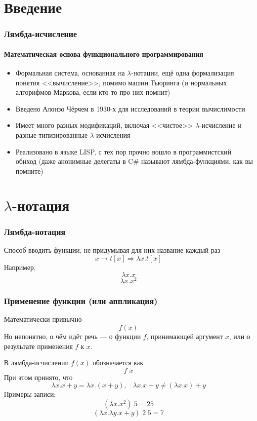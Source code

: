\documentclass{../../slides-style}
\begin{document}
    
    \begin{frame}[plain]
        \titlepage
    \end{frame}

    \section{Введение}
    
    \begin{frame}
        \frametitle{Лямбда-исчисление}
        \framesubtitle{Математическая основа функционального программирования}
        \begin{itemize}
            \item Формальная система, основанная на $\lambda$-нотации, ещё одна формализация
                    понятия <<вычисление>>, помимо машин Тьюринга (и нормальных алгорифмов
                    Маркова, если кто-то про них помнит)
            \item Введено Алонзо Чёрчем в 1930-х для исследований в теории вычислимости
            \item Имеет много разных модификаций, включая <<чистое>> $\lambda$-исчисление и
                    разные типизированные $\lambda$-исчисления
            \item Реализовано в языке LISP, с тех пор прочно вошло в программистский обиход
                    (даже анонимные делегаты в C\# называют лямбда-функциями, как вы помните)
        \end{itemize}
    \end{frame}
        
    \section{$\lambda$-нотация}
        
    \begin{frame}
        \frametitle{Лямбда-нотация}
        Способ вводить функции, не придумывая для них название каждый раз
        $$x \rightarrow t[x] \Longrightarrow \lambda x.t[x]$$
        Например,
        $$\lambda x.x$$
        $$\lambda x.x^2$$
    \end{frame}

    \begin{frame}
        \frametitle{Применение функции (или аппликация)}
        Математически привычно
        $$f(x)$$
        Но непонятно, о чём идёт речь --- о функции $f$, принимающей аргумент $x$, или о результате применения
        $f$ к $x$. 

        В лямбда-исчислении $f(x)$ обозначается как
        $$f \; x$$
        При этом принято, что
        $$\lambda x. x + y = \lambda x.(x + y), \;\;\; 
        \lambda x. x + y \neq (\lambda x.x) + y$$
        Примеры записи:
        $$(\lambda x.x^2) \; 5 = 25$$
        $$(\lambda x.\lambda y.x + y) \; 2 \; 5 = 7$$
    \end{frame}
\end{document}
